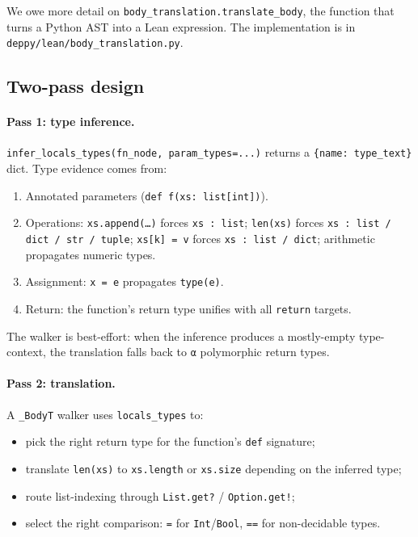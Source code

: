 We owe more detail on \texttt{body\_translation.translate\_body}, the
function that turns a Python AST into a Lean expression.  The
implementation is in \texttt{deppy/lean/body\_translation.py}.

\subsection{Two-pass design}

\paragraph{Pass 1: type inference.}
\texttt{infer\_locals\_types(fn\_node, param\_types=...)} returns a
\texttt{\{name: type\_text\}} dict.  Type evidence comes from:
\begin{enumerate}[leftmargin=1.7em]
  \item Annotated parameters (\texttt{def f(xs: list[int])}).
  \item Operations: \texttt{xs.append(\dots)} forces
    \texttt{xs : list}; \texttt{len(xs)} forces \texttt{xs : list /
    dict / str / tuple}; \texttt{xs[k] = v} forces \texttt{xs : list
    / dict}; arithmetic propagates numeric types.
  \item Assignment: \texttt{x = e} propagates \texttt{type(e)}.
  \item Return: the function's return type unifies with all
    \texttt{return} targets.
\end{enumerate}
The walker is best-effort: when the inference produces a mostly-empty
type-context, the translation falls back to \texttt{α} polymorphic
return types.

\paragraph{Pass 2: translation.}
A \texttt{\_BodyT} walker uses \texttt{locals\_types} to:
\begin{itemize}[leftmargin=1.7em]
  \item pick the right return type for the function's
    \texttt{def} signature;
  \item translate \texttt{len(xs)} to \texttt{xs.length} or
    \texttt{xs.size} depending on the inferred type;
  \item route list-indexing through \texttt{List.get?} /
    \texttt{Option.get!};
  \item select the right comparison: \texttt{=} for
    \texttt{Int}/\texttt{Bool}, \texttt{==} for non-decidable types.
\end{itemize}

